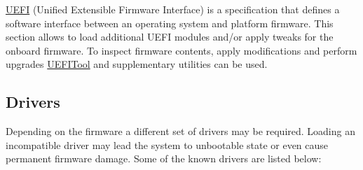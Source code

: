 \documentclass[]{article}
\begin{document}
\href{https://uefi.org/specifications}{UEFI} (Unified Extensible Firmware Interface)
is a specification that defines a software interface between an operating system and
platform firmware. This section allows to load additional UEFI modules and/or apply
tweaks for the onboard firmware. To inspect firmware contents, apply modifications
and perform upgrades \href{https://github.com/LongSoft/UEFITool/releases}{UEFITool}
and supplementary utilities can be used.

\subsection{Drivers}\label{uefidrivers}

Depending on the firmware a different set of drivers may be required.
Loading an incompatible driver may lead the system to unbootable state or
even cause permanent firmware damage. Some of the known drivers are listed below:
\end{document}
